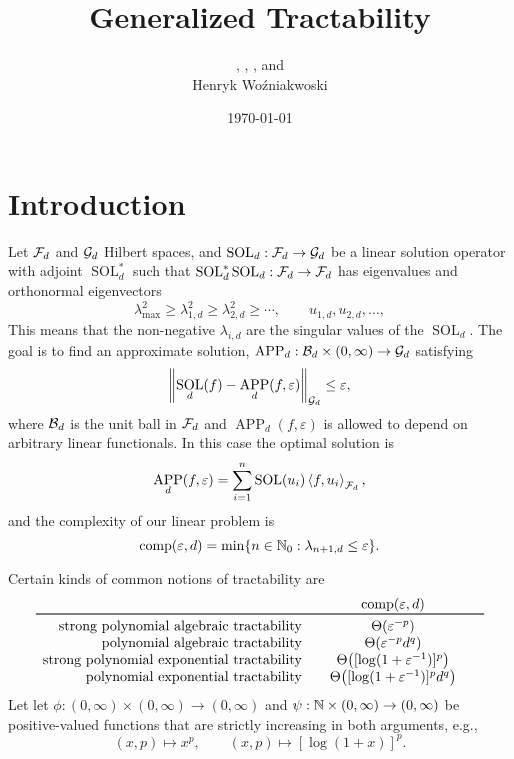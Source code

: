 \documentclass{article}
\title{Generalized Tractability}
\author{\fred{Fred J. Hickernell}, \peter{Peter Kritzer}, \kachi{Onyekachi Osisiogu}, and \\ Henryk Wo\'zniakwoski}
\date{\today}
\DeclareMathOperator{\SOL}{SOL}
\DeclareMathOperator{\APP}{APP}
\theoremstyle{definition}
\begin{document}
\maketitle

\section{Introduction}

Let $\mathcal{F}_d$ and $\mathcal{G}_d$ Hilbert spaces, and $\SOL_d : \cf_d \to \cg_d$ be a linear solution operator with adjoint $\SOL_d^*$ such that $\SOL_d^*\SOL_d : \cf_d \to \cf_d$ has eigenvalues and orthonormal eigenvectors  
\[
\lambda_{\max}^2 \ge \lambda_{1,d}^2 \ge \lambda_{2,d}^2 \ge \cdots, \qquad u_{1,d}, u_{2,d}, \ldots, 
\]
This means that the non-negative $\lambda_{i,d}$ are the singular values of the $\SOL_d$. The goal is to find an approximate solution, $\APP_d:\cb_d \times (0,\infty) \to \cg_d$ satisfying 
\[
\norm[\cg_d]{\SOL_d(f) - \APP_d(f,\varepsilon)} \le \varepsilon,
\]
where $\mathcal{B}_d$ is the unit ball in $\mathcal{F}_d$ and $\APP_d(f,\varepsilon)$ is allowed to depend on arbitrary linear functionals.  In this case the optimal solution is 
\[
\APP_d(f,\varepsilon) = \sum_{i=1}^n \SOL(u_i) \ip[\cf_d]{f}{u_i},
\]
and the complexity of our linear problem is
\[
\operatorname{comp}(\varepsilon, d) = \min \{n \in \mathbb{N}_{0} : \lambda_{n+1, d} \le \varepsilon\}.
\]

Certain kinds of common notions of tractability are 
\begin{equation*}
    \begin{array}{r@{\qquad}c@{\qquad}c}
    & \comp(\varepsilon, d)\\
    \toprule
    \text{strong polynomial algebraic  tractability} & \Theta(\varepsilon^{-p})\\
    \text{polynomial algebraic tractability} & \Theta(\varepsilon^{-p}d^{q})\\
    \text{strong polynomial exponential tractability} &  \Theta\bigl([\log(1 + \varepsilon^{-1})]^p\bigr)\\
    \text{polynomial exponential tractability} & \Theta\bigl([\log(1 + \varepsilon^{-1})]^p  d^{q}\bigr)
    \end{array}
\end{equation*}
Let let $\phi : (0,\infty) \times (0,\infty) \to (0,\infty)$ and $\psi : \mathbb{N}  \times (0,\infty) \to (0,\infty)$ be positive-valued functions that are strictly increasing in both arguments, e.g., 
\[
(x,p) \mapsto x^{p}, \qquad (x,p) \mapsto [\log(1+x)]^p.
\]
\end{document}
